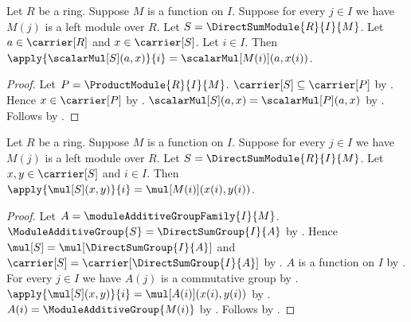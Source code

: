 \begin{proposition}\label{direct_sum_module_scalar_coordinate}
    Let $R$ be a ring.
    Suppose $M$ is a function on $I$.
    Suppose for every $j\in I$ we have $M(j)$ is a left module over $R$.
    Let $S=\DirectSumModule{R}{I}{M}$.
    Let $a\in\carrier[R]$ and $x\in\carrier[S]$.
    Let $i\in I$.
    Then
        $\apply{\scalarMul[S](a,x)}{i}
            =\scalarMul[M(i)](a,x(i))$.
\end{proposition}
\begin{proof}
    Let $P=\ProductModule{R}{I}{M}$.
    $\carrier[S]\subseteq\carrier[P]$ by
        .
    Hence $x\in\carrier[P]$ by .
    $\scalarMul[S](a,x)=\scalarMul[P](a,x)$ by
        .
    Follows by .
\end{proof}

\begin{proposition}\label{direct_sum_module_add_coordinate}
    Let $R$ be a ring.
    Suppose $M$ is a function on $I$.
    Suppose for every $j\in I$ we have $M(j)$ is a left module over $R$.
    Let $S=\DirectSumModule{R}{I}{M}$.
    Let $x,y\in\carrier[S]$ and $i\in I$.
    Then $\apply{\mul[S](x,y)}{i}=\mul[M(i)](x(i),y(i))$.
\end{proposition}
\begin{proof}
    Let $A=\moduleAdditiveGroupFamily{I}{M}$.
    $\ModuleAdditiveGroup{S}=\DirectSumGroup{I}{A}$ by
        .
    Hence $\mul[S]=\mul[\DirectSumGroup{I}{A}]$ and
        $\carrier[S]=\carrier[\DirectSumGroup{I}{A}]$ by
        .
    $A$ is a function on $I$ by
        .
    For every $j\in I$ we have $A(j)$ is a commutative group by
        .
    $\apply{\mul[S](x,y)}{i}=\mul[A(i)](x(i),y(i))$ by
        .
    $A(i)=\ModuleAdditiveGroup{M(i)}$ by
        .
    Follows by .
\end{proof}

